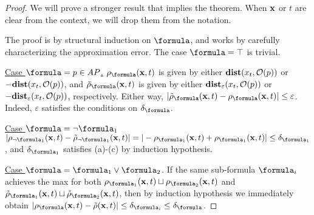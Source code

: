 \begin{proof}
	We will prove a stronger result that implies the theorem.	
	When $\mathbf{x}$ or $t$ are clear from the context, we will drop them from the notation.
	
	The proof is by structural induction on $\formula$, and works by carefully characterizing the approximation error.
	The case $\formula = \top$ is trivial.
	
\underline{Case $\formula = p \in AP$.}
$\robf(\sstraj,t)$ is given by either $\mathbf{dist}(x_t,\mathcal{O}(p))$ or $-\mathbf{dist}(x_t,\mathcal{O}(p))$, and 
$\srobf(\sstraj,t)$ is given by either $\mathbf{dist}_\varepsilon(x_t,\mathcal{O}(p))$ or $-\mathbf{dist}_\varepsilon(x_t,\mathcal{O}(p))$, respectively.
Either way, $|\srobf(\sstraj,t) - \robf(\sstraj,t)| \leq \varepsilon$.
Indeed, $\varepsilon$ satisfies the conditions on $\delta_\formula$.

\underline{Case $\formula = \neg \formula_1$} 
$|\rob_{\neg \formula_1}(\sstraj,t)-\srob_{\neg \formula_1}(\sstraj,t)| = |-\rob_{\formula_1}(\sstraj,t) + \rob_{ \formula_1}(\sstraj,t)|  \leq \delta_{\formula_1}$, and $\delta_{\formula_1}$ satisfies (a)-(c) by induction hypothesis.

\underline{Case $\formula = \formula_1 \lor \formula_2$}.
If the same sub-formula $\formula_i$ achieves the max for both $\rob_{\formula_1}(\sstraj,t) \sqcup \rob_{\formula_2}(\sstraj,t)$ and $\srob_{\formula_1}(\sstraj,t) \sqcup \srob_{\formula_2}(\sstraj,t)$, then by induction hypothesis we immediately obtain 
$|\robf(\sstraj,t)-\srob(\sstraj,t)|  \leq \delta_{\formula_i} \leq \delta_{\formula}$.


\end{proof}

